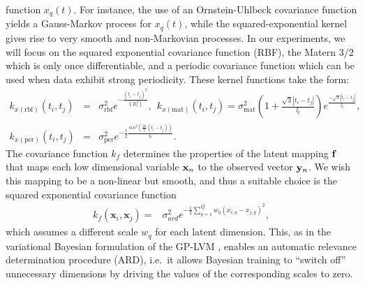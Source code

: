\documentclass{article} %
\begin{document}
function $x_q(t)$. For instance, the use of an Ornstein-Uhlbeck
covariance function yields a Gauss-Markov process for $x_q(t)$, while
the squared-exponential kernel gives rise to very smooth and
non-Markovian processes. In our experiments, we will focus on the squared exponential
covariance function (RBF), the Matern $3/2$ which is only once
differentiable, and a periodic covariance function
\cite{rasmussen-williams, MacKay98} which can be used when data
exhibit strong periodicity. These kernel functions take the form:
\begin{eqnarray}
k_{x(\text{rbf})} \left( \mathit{t_i, t_j} \right) 
& = & \sigma_{\text{rbf}}^2 e^{- \frac{\left( t_i - t_j \right)^2}{\left(
      2l_t^2 \right)}}, 
\ \ k_{x(\text{mat})} \left( t_i, t_j \right) =  
\sigma_{\text{mat}}^2 \left( 1 + \frac{\sqrt{3} |t_i - t_j|}{l_t} \right)
		e^{\frac{ - \sqrt{3} |t_i - t_j|}{l_t} }, \nonumber \\
k_{x(\text{per})} \left( \mathit{t_i, t_j} \right) 
& = & 
	\sigma_{\text{per}}^2 e^{-\frac{1}{2} \frac{sin^2 \left( \frac{2
                \pi}{T} \left( t_i - t_j \right) \right) }{l_t} }. 
 \label{eq:temporalkernels}
\end{eqnarray}
The covariance function $k_f$ determines the properties of the latent
mapping $\mathbf{f}$ that maps each low dimensional variable $\mathbf{x}_n$ to the
observed vector $\mathbf{y}_n$. We wish this mapping to be a non-linear but
smooth, and thus a suitable choice is the squared exponential
covariance function
\begin{align}
\mathit{k_f} \left( \mathbf{x}_i, \mathbf{x}_j \right) = {} &  
		\sigma_{ard}^2 e^{
			- \frac{1}{2} \sum_{q=1}^{Q}  w_q \left(
                          \mathit{x_{i,q} - x_{j,q}} \right) ^2 },
\label{rbfard}
\end{align}
which assumes a different scale $w_q$ for each latent dimension. This,
as in the variational Bayesian formulation of the GP-LVM
\cite{BayesianGPLVM}, enables an automatic relevance determination
procedure (ARD), i.e.\ it allows Bayesian training to ``switch off''
unnecessary dimensions by driving the values of the corresponding
scales to zero.
\end{document}
